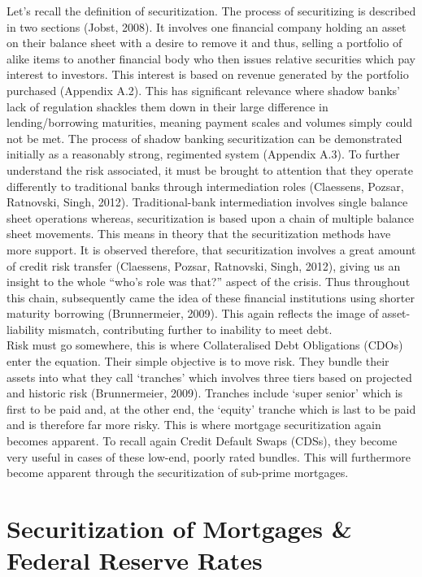 \documentclass[11pt, english]{article}
\begin{document}
	Let’s recall the definition of securitization. The process of securitizing is described in two sections (Jobst, 2008). It involves one financial company holding an asset on their balance sheet with a desire to remove it and thus, selling a portfolio of alike items to another financial body who then issues relative securities which pay interest to investors. This interest is based on revenue generated by the portfolio purchased (Appendix A.2). This has significant relevance where shadow banks’ lack of regulation shackles them down in their large difference in lending/borrowing maturities, meaning payment scales and volumes simply could not be met. The process of shadow banking securitization can be demonstrated initially as a reasonably strong, regimented system (Appendix A.3). To further understand the risk associated, it must be brought to attention that they operate differently to traditional banks through intermediation roles (Claessens, Pozsar, Ratnovski, Singh, 2012). Traditional-bank intermediation involves single balance sheet operations whereas, securitization is based upon a chain of multiple balance sheet movements. This means in theory that the securitization methods have more support. It is observed therefore, that securitization involves a great amount of credit risk transfer (Claessens, Pozsar, Ratnovski, Singh, 2012), giving us an insight to the whole “who’s role was that?” aspect of the crisis. Thus throughout this chain, subsequently came the idea of these financial institutions using shorter maturity borrowing (Brunnermeier, 2009). This again reflects the image of asset-liability mismatch, contributing further to inability to meet debt.\\

	Risk must go somewhere, this is where Collateralised Debt Obligations (CDOs) enter the equation. Their simple objective is to move risk. They bundle their assets into what they call ‘tranches’ which involves three tiers based on projected and historic risk (Brunnermeier, 2009). Tranches include ‘super senior’ which is first to be paid and, at the other end, the ‘equity’ tranche which is last to be paid and is therefore far more risky. This is where mortgage securitization again becomes apparent. To recall again Credit Default Swaps (CDSs), they become very useful in cases of these low-end, poorly rated bundles. This will furthermore become apparent through the securitization of sub-prime mortgages.

\newpage

\section{Securitization of Mortgages \& Federal Reserve Rates}
\end{document}
